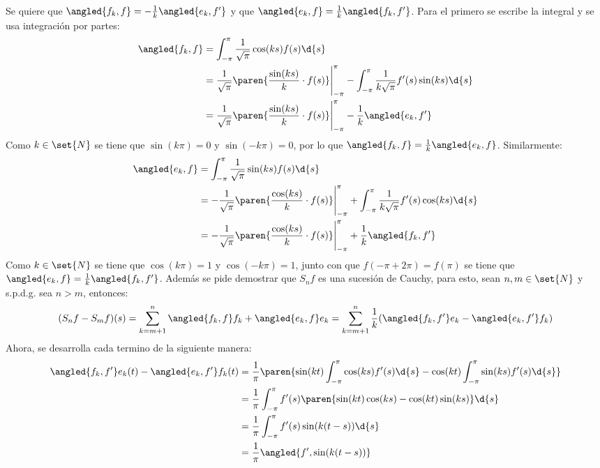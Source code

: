 \documentclass{homework}
\begin{document}
\begin{sol}[1.d]
    Se quiere que \(\angled{f_k,f}=-\frac1k\angled{e_k,f'}\) y que \(\angled{e_k,f}=\frac1k\angled{f_k,f'}\). Para el primero se escribe la integral y se usa integración por partes:
    \begin{align*}
        \angled{f_k,f}&=\int_{-\pi}^\pi\frac1{\sqrt{\pi}}\cos(ks)f(s)\d{s}\\
        &=\frac1{\sqrt{\pi}}\paren{\frac{\sin(ks)}k\cdot f(s)}\Bigg\vert_{-\pi}^\pi-\int_{-\pi}^\pi\frac1{k\sqrt{\pi}}f'(s)\sin(ks)\d{s}\\
        &=\frac1{\sqrt{\pi}}\paren{\frac{\sin(ks)}k\cdot f(s)}\Bigg\vert_{-\pi}^\pi-\frac1k\angled{e_k,f'}
    \end{align*}
    Como \(k\in\set{N}\) se tiene que \(\sin(k\pi)=0\) y \(\sin(-k\pi)=0\), por lo que \(\angled{f_k,f}=\frac1k\angled{e_k,f}\). Similarmente:
    \begin{align*}
        \angled{e_k,f}&=\int_{-\pi}^\pi\frac1{\sqrt{\pi}}\sin(ks)f(s)\d{s}\\
        &=-\frac1{\sqrt{\pi}}\paren{\frac{\cos(ks)}k\cdot f(s)}\Bigg\vert_{-\pi}^\pi+\int_{-\pi}^\pi\frac1{k\sqrt{\pi}}f'(s)\cos(ks)\d{s}\\
        &=-\frac1{\sqrt{\pi}}\paren{\frac{\cos(ks)}k\cdot f(s)}\Bigg\vert_{-\pi}^\pi+\frac1k\angled{f_k,f'}
    \end{align*}
    Como \(k\in\set{N}\) se tiene que \(\cos(k\pi)=1\) y \(\cos(-k\pi)=1\), junto con que \(f(-\pi+2\pi)=f(\pi)\) se tiene que \(\angled{e_k,f}=\frac1k\angled{f_k,f'}\). Además se pide demostrar que \(S_n f\) es una sucesión de Cauchy, para esto, sean \(n,m\in\set{N}\) y s.p.d.g. sea \(n>m\), entonces:
    \begin{equation*}
        (S_n f-S_m f)(s)=\sum_{k=m+1}^n\angled{f_k,f}f_k+\angled{e_k,f}e_k=\sum_{k=m+1}^n\frac1k(\angled{f_k,f'}e_k-\angled{e_k,f'}f_k)
    \end{equation*}
    Ahora, se desarrolla cada termino de la siguiente manera:
    \begin{align*}
        \angled{f_k,f'}e_k(t)-\angled{e_k,f'}f_k(t)&=\frac1\pi\paren{\sin(kt)\int_{-\pi}^\pi\cos(ks)f'(s)\d{s}-\cos(kt)\int_{-\pi}^\pi\sin(ks)f'(s)\d{s}}\\
        &=\frac1\pi\int_{-\pi}^\pi f'(s)\paren{\sin(kt)\cos(ks)-\cos(kt)\sin(ks)}\d{s}\\
        &=\frac1\pi\int_{-\pi}^\pi f'(s)\sin(k(t-s))\d{s}\\
        &=\frac1\pi\angled{f',\sin(k(t-s))}\\

\end{align*}
\end{sol}
\end{document}
